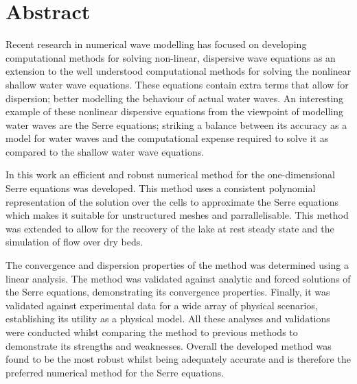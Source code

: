 \chapter*{Abstract}\label{abstract}


Recent research in numerical wave modelling has focused on developing computational methods for solving non-linear, dispersive wave equations as an extension to the well understood computational methods for solving the nonlinear shallow water wave equations. These equations contain extra terms that allow for dispersion; better modelling the behaviour of actual water waves. An interesting example of these nonlinear dispersive equations from the viewpoint of modelling water waves are the Serre equations; striking a balance between its accuracy as a model for water waves and the computational expense required to solve it as compared to the shallow water wave equations. 

In this work an efficient and robust numerical method for the one-dimensional Serre equations was developed. This method uses a consistent polynomial representation of the solution over the cells to approximate the Serre equations which makes it suitable for unstructured meshes and parrallelisable. This method was extended to allow for the recovery of the lake at rest steady state and the simulation of flow over dry beds.  

The convergence and dispersion properties of the method was determined using a linear analysis. The method was validated against analytic and forced solutions of the Serre equations, demonstrating its convergence properties. Finally, it was validated against experimental data for a wide array of physical scenarios, establishing its utility as a physical model. All these analyses and validations were conducted whilst comparing the method to previous methods to demonstrate its strengths and weaknesses. Overall the developed method was found to be the most robust whilst being adequately accurate and is therefore the preferred numerical method for the Serre equations.


